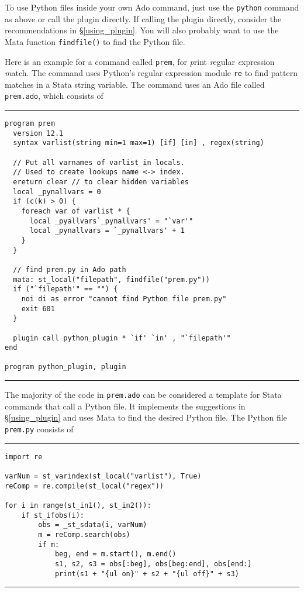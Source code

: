 \documentclass{article}
\begin{document}
To use Python files inside your own Ado command, just use the \lstinline{python} command as above or call the plugin directly. If calling the plugin directly, consider the recommendations in \S\ref{using_plugin}. You will also probably want to use the Mata function \lstinline{findfile()} to find the Python file.

Here is an example for a command called \lstinline{prem}, for \textit{p}rint \textit{r}egular \textit{e}xpression \textit{m}atch. The command uses Python's regular expression module \lstinline{re} to find pattern matches in a Stata string variable. The command uses an Ado file called \lstinline{prem.ado}, which consists of\newline

\hrule
{\small
\begin{lstlisting}
program prem
  version 12.1
  syntax varlist(string min=1 max=1) [if] [in] , regex(string)
  
  // Put all varnames of varlist in locals.
  // Used to create lookups name <-> index.
  ereturn clear // to clear hidden variables
  local _pynallvars = 0
  if (c(k) > 0) {
    foreach var of varlist * {
      local _pyallvars`_pynallvars' = "`var'"
      local _pynallvars = `_pynallvars' + 1
    }
  }
	
  // find prem.py in Ado path
  mata: st_local("filepath", findfile("prem.py"))
  if ("`filepath'" == "") {
    noi di as error "cannot find Python file prem.py"
    exit 601
  }
  
  plugin call python_plugin * `if' `in' , "`filepath'"
end

program python_plugin, plugin
\end{lstlisting}}
\hrule

\medskip
\medskip

\noindent The majority of the code in \lstinline{prem.ado} can be considered a template for Stata commands that call a Python file. It implements the suggestions in \S\ref{using_plugin} and uses Mata to find the desired Python file. The Python file \lstinline{prem.py} consists of\newline

\hrule
{\small
\begin{lstlisting}
import re

varNum = st_varindex(st_local("varlist"), True)
reComp = re.compile(st_local("regex"))

for i in range(st_in1(), st_in2()):
    if st_ifobs(i):
        obs = _st_sdata(i, varNum)
        m = reComp.search(obs)
        if m: 
            beg, end = m.start(), m.end()
            s1, s2, s3 = obs[:beg], obs[beg:end], obs[end:]
            print(s1 + "{ul on}" + s2 + "{ul off}" + s3)
\end{lstlisting}}
\hrule
\end{document}
